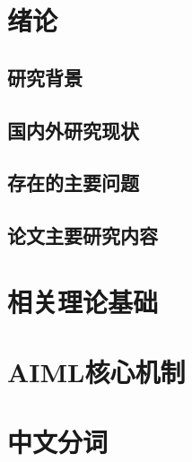 \documentclass[bachelor,winfonts]{jnuthesis}
\author{谭啸}
\institute{江南大学}
\begin{document}
\maketitle

\frontmatter

\begin{abstract}

\end{abstract}

\begin{englishabstract}

\end{englishabstract}

\tableofcontents

\mainmatter

\chapter{绪论}\label{chapter_introduction}

\section{研究背景}
\section{国内外研究现状}
\section{存在的主要问题}
\section{论文主要研究内容}


\chapter{相关理论基础}


\chapter{AIML核心机制}


\chapter{中文分词}
\end{document}
